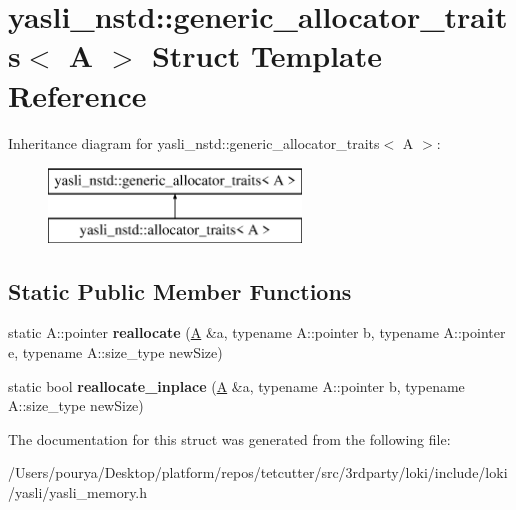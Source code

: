 \hypertarget{structyasli__nstd_1_1generic__allocator__traits}{}\section{yasli\+\_\+nstd\+:\+:generic\+\_\+allocator\+\_\+traits$<$ A $>$ Struct Template Reference}
\label{structyasli__nstd_1_1generic__allocator__traits}
Inheritance diagram for yasli\+\_\+nstd\+:\+:generic\+\_\+allocator\+\_\+traits$<$ A $>$\+:\begin{figure}[H]
\begin{center}
\leavevmode
\includegraphics[height=2.000000cm]{structyasli__nstd_1_1generic__allocator__traits}
\end{center}
\end{figure}
\subsection*{Static Public Member Functions}
\begin{DoxyCompactItemize}
\item 
\hypertarget{structyasli__nstd_1_1generic__allocator__traits_a8cdc376004b019a3607aac0a751ba4a9}{}static A\+::pointer {\bfseries reallocate} (\hyperlink{structA}{A} \&a, typename A\+::pointer b, typename A\+::pointer e, typename A\+::size\+\_\+type new\+Size)\label{structyasli__nstd_1_1generic__allocator__traits_a8cdc376004b019a3607aac0a751ba4a9}

\item 
\hypertarget{structyasli__nstd_1_1generic__allocator__traits_a42aded7e251ceb8fcdfa4dcc718064a7}{}static bool {\bfseries reallocate\+\_\+inplace} (\hyperlink{structA}{A} \&a, typename A\+::pointer b, typename A\+::size\+\_\+type new\+Size)\label{structyasli__nstd_1_1generic__allocator__traits_a42aded7e251ceb8fcdfa4dcc718064a7}

\end{DoxyCompactItemize}


The documentation for this struct was generated from the following file\+:\begin{DoxyCompactItemize}
\item 
/\+Users/pourya/\+Desktop/platform/repos/tetcutter/src/3rdparty/loki/include/loki/yasli/yasli\+\_\+memory.\+h\end{DoxyCompactItemize}

